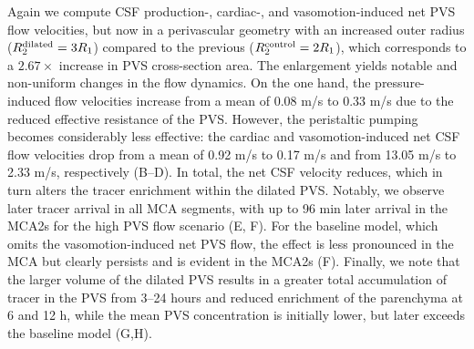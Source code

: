 \documentclass[fleqn,10pt]{wlscirep}
\begin{document}
Again we compute CSF production-, cardiac-, and vasomotion-induced net PVS flow velocities, but now in a perivascular geometry with an increased outer radius ($R^{\rm dilated}_2 = 3 R_1$) compared to the previous ($R^{\rm control}_2 = 2 R_1$), which corresponds to a $2.67 \times$ increase in PVS cross-section area.
The enlargement yields notable and non-uniform changes in the flow
dynamics. On the one hand, the pressure-induced flow velocities
increase from a mean of 0.08 \textmu m/s to 0.33 \textmu m/s due to
the reduced effective resistance of the PVS. However, the peristaltic
pumping becomes considerably less effective: the cardiac and
vasomotion-induced net CSF flow velocities drop from a mean of 0.92
\textmu m/s to 0.17 \textmu m/s and from 13.05 \textmu m/s to 2.33
\textmu m/s, respectively (B--D). In total, the
net CSF velocity reduces, which in turn alters the tracer enrichment
within the dilated PVS. Notably, we observe later tracer arrival in
all MCA segments, with up to 96 min later arrival in the
MCA2s for the high PVS flow scenario (E, F). For
the baseline model, which omits the vasomotion-induced net PVS flow,
the effect is less pronounced in the MCA but clearly persists and is
evident in the MCA2s (F). Finally, we note that
the larger volume of the dilated PVS results in a greater total
accumulation of tracer in the PVS from 3--24 hours and reduced
enrichment of the parenchyma at 6 and 12 h, while the mean PVS
concentration is initially lower, but later exceeds the baseline model (G,H).
\end{document}
